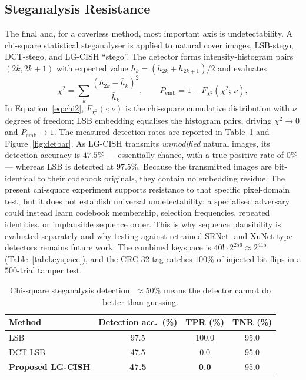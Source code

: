 \documentclass[10pt,a4paper]{article}
\theoremstyle{definition}
\begin{document}
\subsection{Steganalysis Resistance}\label{sec:steganalysis}
The final and, for a coverless method, most important axis is undetectability. A
chi-square statistical steganalyser is applied to natural cover images, LSB-stego,
DCT-stego, and LG-CISH ``stego''. The detector forms intensity-histogram pairs
$(2k,2k{+}1)$ with expected value $\bar h_k=(h_{2k}+h_{2k+1})/2$ and evaluates
\begin{equation}
  \chi^2=\sum_{k}\frac{\left(h_{2k}-\bar h_k\right)^2}{\bar h_k},
  \qquad
  P_{\mathrm{emb}}=1-F_{\chi^2}\!\left(\chi^2;\,\nu\right),
  \label{eq:chi2}
\end{equation}
In Equation~\eqref{eq:chi2}, $F_{\chi^2}(\cdot;\nu)$ is the chi-square cumulative
distribution with $\nu$
degrees of freedom; LSB embedding equalises the histogram pairs, driving
$\chi^2\!\to\!0$ and $P_{\mathrm{emb}}\!\to\!1$. The measured detection rates are
reported in Table~\ref{tab:steg} and Figure~\ref{fig:detbar}. As LG-CISH transmits
\emph{unmodified} natural images, its detection accuracy is $47.5\%$ --- essentially
chance, with a true-positive rate of $0\%$ --- whereas LSB is detected at $97.5\%$.
Because the transmitted images are bit-identical to their codebook originals, they
contain no embedding residue. The present chi-square experiment supports resistance
to that specific pixel-domain test, but it does not establish universal
undetectability: a specialised adversary could instead learn codebook membership,
selection frequencies, repeated identities, or implausible sequence order. This is
why sequence plausibility is evaluated separately and why testing against retrained
SRNet- and XuNet-type detectors remains future work. The combined keyspace is
$40!\cdot2^{256}\approx2^{415}$
(Table~\ref{tab:keyspace}), and the CRC-32 tag catches $100\%$ of injected bit-flips
in a $500$-trial tamper test.

\begin{table}[t]
\centering
\caption{Chi-square steganalysis detection. $\approx$50\% means the detector cannot do better than guessing.}\label{tab:steg}
\begin{tabular}{@{}lccc@{}}
\toprule
Method & Detection acc.\ (\%) & TPR (\%) & TNR (\%) \\
\midrule
LSB              & 97.5 & 100.0 & 95.0 \\
DCT-LSB          & 47.5 & 0.0 & 95.0 \\
\textbf{Proposed LG-CISH} & \textbf{47.5} & \textbf{0.0} & 95.0 \\
\bottomrule
\end{tabular}
\end{table}
\end{document}
